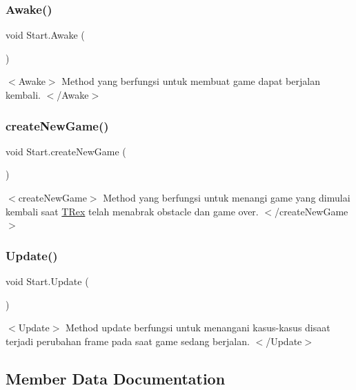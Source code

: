 \subsubsection{\texorpdfstring{Awake()}{Awake()}}
{\footnotesize\ttfamily void Start.\+Awake (\begin{DoxyParamCaption}{ }\end{DoxyParamCaption})\hspace{0.3cm}{\ttfamily [private]}}

$<$\+Awake$>$ Method yang berfungsi untuk membuat game dapat berjalan kembali. $<$/\+Awake$>$ \hypertarget{class_start_aa9c0928bb57e1ce99c81cc9ad0ab3355}{}\label{class_start_aa9c0928bb57e1ce99c81cc9ad0ab3355} 
\subsubsection{\texorpdfstring{create\+New\+Game()}{createNewGame()}}
{\footnotesize\ttfamily void Start.\+create\+New\+Game (\begin{DoxyParamCaption}{ }\end{DoxyParamCaption})\hspace{0.3cm}{\ttfamily [private]}}

$<$create\+New\+Game$>$ Method yang berfungsi untuk menangi game yang dimulai kembali saat \hyperlink{class_t_rex}{T\+Rex} telah menabrak obstacle dan game over. $<$/create\+New\+Game$>$ \hypertarget{class_start_a7911d6483c913d209dda8b107285a721}{}\label{class_start_a7911d6483c913d209dda8b107285a721} 
\subsubsection{\texorpdfstring{Update()}{Update()}}
{\footnotesize\ttfamily void Start.\+Update (\begin{DoxyParamCaption}{ }\end{DoxyParamCaption})\hspace{0.3cm}{\ttfamily [private]}}

$<$\+Update$>$ Method update berfungsi untuk menangani kasus-\/kasus disaat terjadi perubahan frame pada saat game sedang berjalan. $<$/\+Update$>$ 

\subsection{Member Data Documentation}
\hypertarget{class_start_a3e014e9f3fcc60afaf93ce46b4f23377}{}\label{class_start_a3e014e9f3fcc60afaf93ce46b4f23377} 

